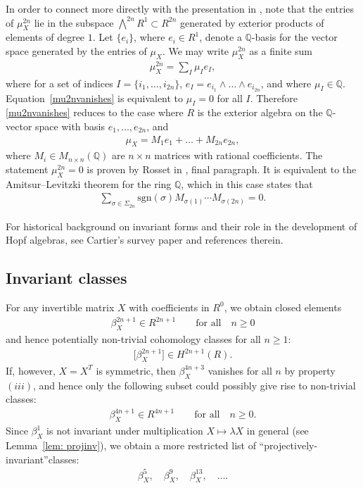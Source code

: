 \documentclass[pdftex]{sigma}%
\numberwithin{equation}{section}
\newcommand{\Q}{\mathbb Q}
\newcommand{\mc}{\mu}
\newcommand{\0}{\color{blue}{\mathsf{0}}}
\begin{document}
\begin{rem} In order to connect more directly with the presentation in \cite{Rosset76}, note that
the entries of $\mc^{2n}_X $ lie in the subspace $\textstyle{\bigwedge^{\!\!2n}} R^1 \subset R^{2n}$ generated by exterior products of elements of degree $1$. Let $\{e_i\}$, where $e_i \in R^1$, denote a $\Q$-basis for the vector space generated by the entries of $\mu_X$. We may write $\mc^{2n}_X$ as a finite sum
\begin{gather*}
\mc^{2n}_X = \sum_I \mu_I e_I,
\end{gather*}
where for a set of indices $I=\{i_1,\dots, i_{2n}\}$, $e_I = e_{i_1} \wedge \dots \wedge e_{i_{2n}}$, and where $\mu_I \in \Q$. Equation~\eqref{mu2nvanishes} is equivalent to $\mu_I=0$ for all $I$. Therefore \eqref{mu2nvanishes} reduces to the case where $R$ is the exterior algebra on the $\Q$-vector space with basis $e_1,\dots, e_{2n}$, and
\begin{gather*}
\mu_X = M_1 e_1 + \dots + M_{2n} e_{2n},
\end{gather*}
where $M_i\in M_{n\times n}(\Q)$ are $n\times n$ matrices with rational coefficients.
The statement $\mu_X^{2n}=0$ is proven by Rosset in \cite{Rosset76}, final paragraph. It is equivalent to the Amitsur--Levitzki theorem for the ring $\Q$, which in this case states that
\begin{gather*}
\sum_{\sigma \in \Sigma_{2n}} \mathrm{sgn}(\sigma) M_{\sigma(1)}\cdots M_{\sigma(2n)}=0.
\end{gather*}
\end{rem}
For historical background on invariant forms and their role in the development of Hopf algebras, see Cartier's survey paper
\cite[Section~2.1]{Cartier} and references therein.

\subsection{Invariant classes}
For any invertible matrix $X$ with coefficients in $R^0$, we obtain closed elements
\begin{gather*}
\beta^{2n+1}_X \in R^{2n+1} \qquad \text{for all}\quad n\geq 0
\end{gather*}
and hence potentially non-trivial cohomology classes for all $n\geq 1$:
\begin{gather*}
\big[\beta^{2n+1}_X \big] \in H^{2n+1}(R).
\end{gather*}
If, however, $X=X^T$ is symmetric, then $\beta_X^{4n+3}$ vanishes for all $n$ by property $(iii)$, and hence only the following subset could possibly give rise to non-trivial classes:
\begin{gather*}
\beta^{4n+1}_X \in R^{4n+1} \qquad \text{for all}\quad n\geq 0.
\end{gather*}
Since $\beta^1_X$ is not invariant under multiplication $X \mapsto \lambda X$ in general (see Lemma~\ref{lem: projinv}), we obtain a more restricted list of ``projectively-invariant''classes:
\begin{gather*}
\beta^5_X,\quad \beta^9_X,\quad \beta^{13}_X ,\quad \dots .
\end{gather*}
\end{document}
